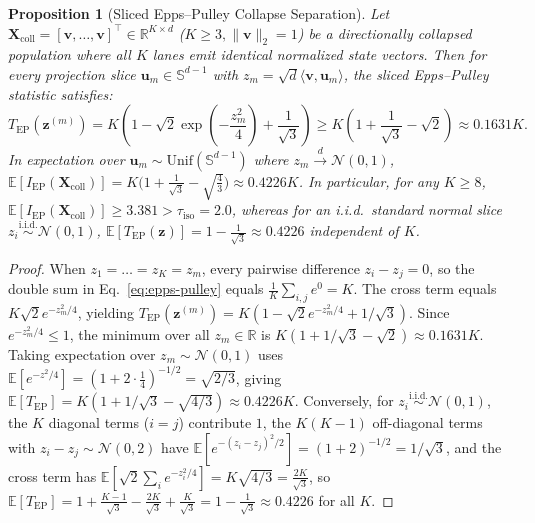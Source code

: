 \documentclass[11pt]{article}
\newtheorem{proposition}{Proposition}
\begin{document}
\begin{proposition}[Sliced Epps--Pulley Collapse Separation]
\label{prop:sigreg}
Let $\mathbf{X}_{\text{coll}} = [\mathbf{v}, \dots, \mathbf{v}]^\top \in \mathbb{R}^{K \times d}$ ($K \ge 3, \|\mathbf{v}\|_2 = 1$) be a directionally collapsed population where all $K$ lanes emit identical normalized state vectors. Then for every projection slice $\mathbf{u}_m \in \mathbb{S}^{d-1}$ with $z_m = \sqrt{d}\langle \mathbf{v}, \mathbf{u}_m \rangle$, the sliced Epps--Pulley statistic satisfies:
\begin{equation}
T_{\text{EP}}(\mathbf{z}^{(m)}) = K\left(1 - \sqrt{2}\exp\!\left(-\frac{z_m^2}{4}\right) + \frac{1}{\sqrt{3}}\right) \ge K\left(1 + \frac{1}{\sqrt{3}} - \sqrt{2}\right) \approx 0.1631 K.
\end{equation}
In expectation over $\mathbf{u}_m \sim \text{Unif}(\mathbb{S}^{d-1})$ where $z_m \stackrel{d}{\to} \mathcal{N}(0,1)$, $\mathbb{E}[I_{\text{EP}}(\mathbf{X}_{\text{coll}})] = K\bigl(1 + \frac{1}{\sqrt{3}} - \sqrt{\frac{4}{3}}\bigr) \approx 0.4226 K$. In particular, for any $K \ge 8$, $\mathbb{E}[I_{\text{EP}}(\mathbf{X}_{\text{coll}})] \ge 3.381 > \tau_{\text{iso}} = 2.0$, whereas for an i.i.d.\ standard normal slice $z_i \stackrel{\text{i.i.d.}}{\sim} \mathcal{N}(0,1)$, $\mathbb{E}[T_{\text{EP}}(\mathbf{z})] = 1 - \frac{1}{\sqrt{3}} \approx 0.4226$ independent of $K$.
\end{proposition}
\begin{proof}
When $z_1 = \dots = z_K = z_m$, every pairwise difference $z_i - z_j = 0$, so the double sum in Eq.~\eqref{eq:epps-pulley} equals $\frac{1}{K}\sum_{i,j} e^0 = K$. The cross term equals $K\sqrt{2}e^{-z_m^2/4}$, yielding $T_{\text{EP}}(\mathbf{z}^{(m)}) = K(1 - \sqrt{2}e^{-z_m^2/4} + 1/\sqrt{3})$. Since $e^{-z_m^2/4} \le 1$, the minimum over all $z_m \in \mathbb{R}$ is $K(1 + 1/\sqrt{3} - \sqrt{2}) \approx 0.1631K$. Taking expectation over $z_m \sim \mathcal{N}(0,1)$ uses $\mathbb{E}[e^{-z^2/4}] = (1 + 2\cdot\frac{1}{4})^{-1/2} = \sqrt{2/3}$, giving $\mathbb{E}[T_{\text{EP}}] = K(1 + 1/\sqrt{3} - \sqrt{4/3}) \approx 0.4226K$. Conversely, for $z_i \stackrel{\text{i.i.d.}}{\sim} \mathcal{N}(0,1)$, the $K$ diagonal terms ($i=j$) contribute $1$, the $K(K-1)$ off-diagonal terms with $z_i - z_j \sim \mathcal{N}(0,2)$ have $\mathbb{E}[e^{-(z_i-z_j)^2/2}] = (1 + 2)^{-1/2} = 1/\sqrt{3}$, and the cross term has $\mathbb{E}[\sqrt{2}\sum_i e^{-z_i^2/4}] = K\sqrt{4/3} = \frac{2K}{\sqrt{3}}$, so $\mathbb{E}[T_{\text{EP}}] = 1 + \frac{K-1}{\sqrt{3}} - \frac{2K}{\sqrt{3}} + \frac{K}{\sqrt{3}} = 1 - \frac{1}{\sqrt{3}} \approx 0.4226$ for all $K$.
\end{proof}
\end{document}
